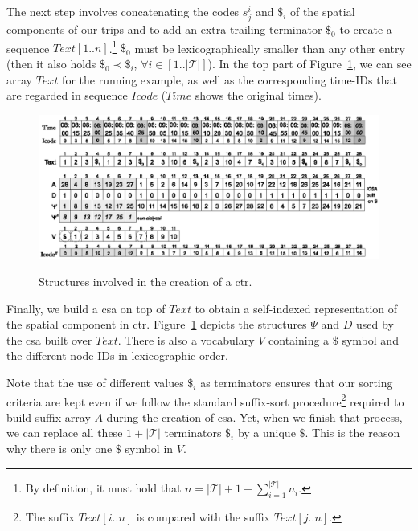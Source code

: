 	The next step involves concatenating the codes $s^i_j$ and $\$_i$ of the spatial components of our trips and to add an 
	extra trailing terminator $\$_0$ to create a sequence $Text[1..n]$.\footnote{By definition, it must hold that $n = |\mathcal{T}| + 1 + \displaystyle\sum^{|\mathcal{T}|}_{i=1} n_i$.} $\$_0$ must be  lexicographically 
	smaller than any other entry (then it also holds $\$_0 \prec \$_i$, $\forall i \in [1..|\mathcal{T}|]$). In the top part of
	Figure~\ref{fig:tcsa}, we can see array $Text$ for the running example, as well as the corresponding time-IDs that
	are regarded in sequence $Icode$  ($Time$ shows the original times).
	
	\begin{figure}[ht]
	  \begin{center}
	  {\includegraphics[width=1.00\textwidth]{figures/csttr.eps}}
	  \end{center}
	  \caption{Structures involved in the creation of a \acrshort{ctr}.}
	  \label{fig:tcsa}
	\end{figure}

	Finally, we build a \gls{csa} on top of $Text$ to obtain a self-indexed representation of the spatial component in \gls{ctr}.
	Figure~\ref{fig:tcsa} depicts the structures $\Psi$ and $D$ used by the \gls{csa} built over $Text$. There is also a vocabulary
	$V$ containing a $\$$ symbol and the different node IDs in lexicographic order.

	Note that the use of different values $\$_i$ as terminators ensures that our sorting criteria are kept even if we follow the
	standard suffix-sort procedure\footnote{The suffix $Text[i..n]$ is compared with the suffix $Text[j..n]$.} 
	required to build suffix array $A$ during the creation of \gls{csa}. Yet, when we finish that
	process, we can replace all these $1+|\mathcal{T}|$ terminators $\$_i$ by a unique $\$$. This is the reason why there is only one $\$$ symbol in $V$. 
	 


